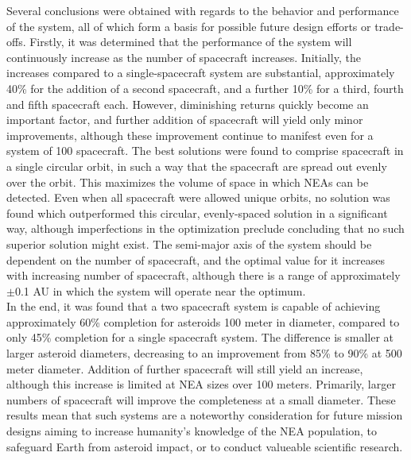 Several conclusions were obtained with regards to the behavior and performance of the system, all of which form a basis for possible future design efforts or trade-offs. Firstly, it was determined that the performance of the system will continuously increase as the number of spacecraft increases. Initially, the increases compared to a single-spacecraft system are substantial, approximately 40\% for the addition of a second spacecraft, and a further 10\% for a third, fourth and fifth spacecraft each. However, diminishing returns quickly become an important factor, and further addition of spacecraft will yield only minor improvements, although these improvement continue to manifest even for a system of 100 spacecraft. The best solutions were found to comprise spacecraft in a single circular orbit, in such a way that the spacecraft are spread out evenly over the orbit. This maximizes the volume of space in which NEAs can be detected. Even when all spacecraft were allowed unique orbits, no solution was found which outperformed this circular, evenly-spaced solution in a significant way, although imperfections in the optimization preclude concluding that no such superior solution might exist. The semi-major axis of the system should be dependent on the number of spacecraft, and the optimal value for it increases with increasing number of spacecraft, although there is a range of approximately $\pm$0.1 AU in which the system will operate near the optimum. \\

In the end, it was found that a two spacecraft system is capable of achieving approximately 60\% completion for asteroids 100 meter in diameter, compared to only 45\% completion for a single spacecraft system. The difference is smaller at larger asteroid diameters, decreasing to an improvement from 85\% to 90\% at 500 meter diameter. Addition of further spacecraft will still yield an increase, although this increase is limited at NEA sizes over 100 meters. Primarily, larger numbers of spacecraft will improve the completeness at a small diameter. These results mean that such systems are a noteworthy consideration for future mission designs aiming to increase humanity's knowledge of the NEA population, to safeguard Earth from asteroid impact, or to conduct valueable scientific research.
